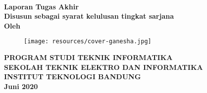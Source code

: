 \clearpage
\pagestyle{empty}


{\selectfont%
\begin{center}
    
    \smallskip

    \large{\bfseries \MakeUppercase{\thetitle}}
    \\[2\baselineskip]

    \large{\bfseries Laporan Tugas Akhir}
    \\[\baselineskip]

    \normalsize{ \bfseries
    	Disusun sebagai syarat kelulusan tingkat sarjana
	}
    \\[3\baselineskip]

    \normalsize{ \bfseries Oleh\\}
    \large{ \bfseries \MakeUppercase{\theauthor}}

    \vfill
    \begin{figure}[h]
        \centering
      	\texttt{[image: resources/cover-ganesha.jpg]}
    \end{figure}
    \vfill

    \large{ \bfseries
	    \uppercase{
	        Program Studi Teknik Informatika \\
	        Sekolah Teknik Elektro dan Informatika \\
	        Institut Teknologi Bandung\\
	    }
    	Juni 2020
	}

\end{center}
}%

\restoregeometry
\clearpage
